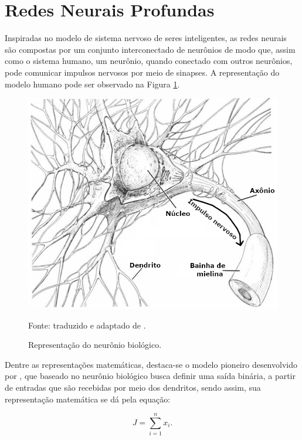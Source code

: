 \newpage
\clearpage

\section{Redes Neurais Profundas}
\label{deep}
Inspiradas no modelo de sistema nervoso de seres inteligentes, as redes neurais são compostas por um conjunto interconectado de neurônios de modo que, assim como o sistema humano, um neurônio, quando conectado com outros neurônios, pode comunicar impulsos nervosos por meio de sinapses. A representação do modelo humano pode ser observado na Figura \ref{deep:fig:1}.

\begin{figure}[H]
    \centering
    \caption{Representação do neurônio biológico.}
    \includegraphics[width=1\linewidth]{recursos/imagens/deep/neuronio.png}
    \label{deep:fig:1}

    Fonte: traduzido e adaptado de \cite{Stevens1979}.
\end{figure}

Dentre as representações matemáticas, destaca-se o modelo pioneiro desenvolvido por \cite{mcculloch1943logical}, que baseado no neurônio biológico busca definir uma saída binária, a partir de entradas que são recebidas por meio dos dendritos, sendo assim, sua representação matemática se dá pela equação:

\begin{equation}
    \label{deep:eq:1}
    J = \sum_{i = 1}^{n} x_i.
\end{equation}

